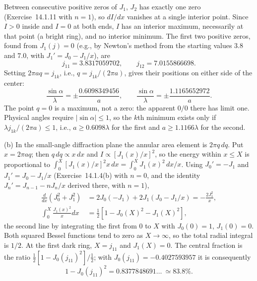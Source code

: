 Between consecutive positive zeros of $J_1$, $J_2$ has exactly one
zero (Exercise~14.1.11 with $n=1$), so $dI/dx$ vanishes at a single
interior point. Since $I>0$ inside and $I=0$ at both ends, $I$ has an
interior maximum, necessarily at that point (a bright ring), and no
interior minimum.
The first two positive zeros, found from
$J_1(j)=0$ (e.g., by Newton's method from the starting values $3.8$
and $7.0$, with $J_1'=J_0-J_1/x$), are
\[
j_{11}=3.8317059702,\qquad j_{12}=7.0155866698.
\]
Setting $2\pi aq=j_{1k}$, i.e., $q=j_{1k}/(2\pi a)$, gives their
positions on either side of the center:
\[
\boxed{\frac{\sin\alpha}{\lambda}
=\pm\frac{0.6098349456}{a},\qquad
\frac{\sin\alpha}{\lambda}
=\pm\frac{1.1165652972}{a}}.
\]
The point $q=0$ is a maximum, not a zero: the apparent $0/0$ there
has limit one. Physical angles require $|\sin\alpha|\le1$, so the
$k$th minimum exists only if $\lambda j_{1k}/(2\pi a)\le1$, i.e.,
$a\ge0.6098\lambda$ for the first and $a\ge1.1166\lambda$ for the
second.

(b) In the small-angle diffraction plane the annular area element is
$2\pi q\,dq$. Put $x=2\pi aq$; then $q\,dq\propto x\,dx$ and
$I\propto[J_1(x)/x]^2$, so the energy within $x\le X$ is
proportional to $\int_0^X[J_1(x)/x]^2x\,dx=\int_0^X J_1(x)^2\,dx/x$.
Using $J_0'=-J_1$ and $J_1'=J_0-J_1/x$ (Exercise~14.1.4(b) with
$n=0$, and the identity $J_n'=J_{n-1}-nJ_n/x$ derived there, with
$n=1$),
\begin{align*}
\frac d{dx}(J_0^2+J_1^2)
&=2J_0(-J_1)+2J_1(J_0-J_1/x)
=-\frac{2J_1^2}{x},\\
\int_0^X\frac{J_1(x)^2}{x}dx
&=\frac12[1-J_0(X)^2-J_1(X)^2],
\end{align*}
the second line by integrating the first from $0$ to $X$ with
$J_0(0)=1$, $J_1(0)=0$. Both squared Bessel functions tend to zero as
$X\to\infty$, so the total radial integral is $1/2$. At the first dark
ring, $X=j_{11}$ and $J_1(X)=0$. The central fraction is the ratio
$\frac12[1-J_0(j_{11})^2]/\frac12$; with
$J_0(j_{11})=-0.4027593957$ it is consequently
\[
\boxed{1-J_0(j_{11})^2=0.8377848691\ldots\ \simeq83.8\%}.
\]


